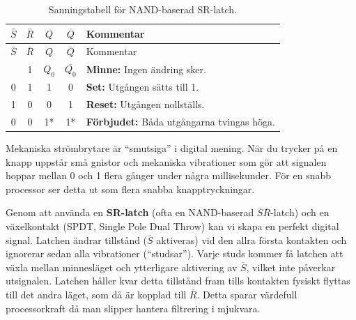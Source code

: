 \documentclass[
  swedish,
  letterpaper,
  oneside,
  openany]{book}
\begin{document}
\begin{longtable}[]{@{}ccccl@{}}
\caption{Sanningstabell för NAND-baserad
SR-latch.}\label{tbl-SR-latch-NAND}\tabularnewline
\toprule\noalign{}
\(\bar{S}\) & \(\bar{R}\) & \(Q\) & \(\overline{Q}\) & Kommentar \\
\midrule\noalign{}
\endfirsthead
\toprule\noalign{}
\(\bar{S}\) & \(\bar{R}\) & \(Q\) & \(\overline{Q}\) & Kommentar \\
\midrule\noalign{}
\endhead
\bottomrule\noalign{}
\endlastfoot
1 & 1 & \(Q_0\) & \(\overline{Q_0}\) & \textbf{Minne:} Ingen ändring
sker. \\
0 & 1 & 1 & 0 & \textbf{Set:} Utgången sätts till 1. \\
1 & 0 & 0 & 1 & \textbf{Reset:} Utgången nollställs. \\
0 & 0 & 1* & 1* & \textbf{Förbjudet:} Båda utgångarna tvingas höga. \\
\end{longtable}

\begin{tcolorbox}[enhanced jigsaw, arc=.35mm, bottomrule=.15mm, bottomtitle=1mm, breakable, colback=white, colbacktitle=quarto-callout-note-color!10!white, colframe=quarto-callout-note-color-frame, coltitle=black, left=2mm, leftrule=.75mm, opacityback=0, opacitybacktitle=0.6, rightrule=.15mm, title=\textcolor{quarto-callout-note-color}{\faInfo}\hspace{0.5em}{Praktiskt exempel: Avstudsning av knappar (Debouncing)}, titlerule=0mm, toprule=.15mm, toptitle=1mm]

Mekaniska strömbrytare är ``smutsiga'' i digital mening. När du trycker
på en knapp uppstår små gnistor och mekaniska vibrationer som gör att
signalen hoppar mellan 0 och 1 flera gånger under några millisekunder.
För en snabb processor ser detta ut som flera snabba knapptryckningar.

Genom att använda en \textbf{SR-latch} (ofta en NAND-baserad
\(\overline{S}\overline{R}\)-latch) och en växelkontakt (SPDT, Single
Pole Dual Throw) kan vi skapa en perfekt digital signal. Latchen ändrar
tillstånd (\(\overline{S}\) aktiveras) vid den allra första kontakten
och ignorerar sedan alla vibrationer (``studsar''). Varje studs kommer
få latchen att växla mellan minnesläget och ytterligare aktivering av
\(\overline{S}\), vilket inte påverkar utsignalen. Latchen håller kvar
detta tillstånd fram tills kontakten fysiskt flyttas till det andra
läget, som då är kopplad till \(\overline{R}\). Detta sparar värdefull
processorkraft då man slipper hantera filtrering i mjukvara.

\end{tcolorbox}
\end{document}
